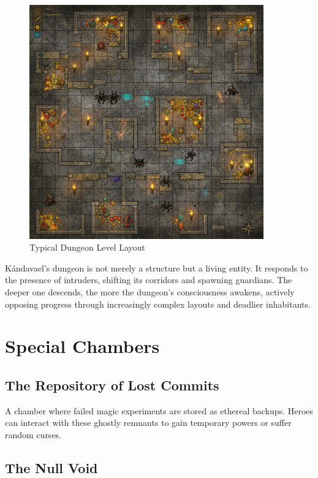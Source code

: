 \documentclass[11pt,a4paper]{book}
\begin{document}
\begin{figure}[H]
    \centering
    \includegraphics[width=0.9\textwidth]{images/dungeon-layout.png}
    \caption{Typical Dungeon Level Layout}
\end{figure}

\begin{lorebox}
Kándavael's dungeon is not merely a structure but a living entity. It responds to the presence of intruders, shifting its corridors and spawning guardians. The deeper one descends, the more the dungeon's consciousness awakens, actively opposing progress through increasingly complex layouts and deadlier inhabitants.
\end{lorebox}

\section{Special Chambers}

\subsection{The Repository of Lost Commits}

A chamber where failed magic experiments are stored as ethereal backups. Heroes can interact with these ghostly remnants to gain temporary powers or suffer random curses.

\subsection{The Null Void}
\end{document}
